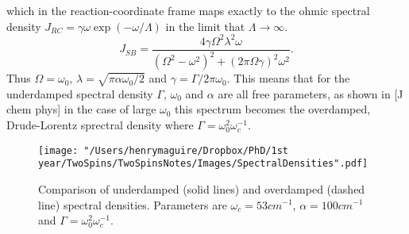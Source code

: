 \documentclass[]{article}
\begin{document}
which in the reaction-coordinate frame maps exactly to the ohmic spectral density $J_{RC} = \gamma \omega \exp(-\omega/\Lambda)$ in the limit that $\Lambda\to\infty$.
\begin{equation}
\label{eq:DrudeLorentzUnderdamped1}
J_{SB}  = \frac{4\gamma\Omega^2\lambda^2\omega}{(\Omega^2-\omega^2)^2 + (2\pi\Omega\gamma)^2\omega^2}.
\end{equation}
Thus $\Omega = \omega_0$, $\lambda=\sqrt{\pi \alpha \omega_0/2}$ and $\gamma=\Gamma/2\pi\omega_0$. This means that for the underdamped spectral density $\Gamma$, $\omega_0$ and $\alpha$ are all free parameters, as shown in [J chem phys] in the case of large $\omega_0$ this spectrum becomes the overdamped, Drude-Lorentz sprectral density where $\Gamma=\omega_0^2\omega_c^{-1}$.

\begin{figure}
	\texttt{[image: "/Users/henrymaguire/Dropbox/PhD/1st year/TwoSpins/TwoSpinsNotes/Images/SpectralDensities".pdf]}
	\caption{Comparison of underdamped (solid lines) and overdamped (dashed line) spectral densities. Parameters are $\omega_c=53cm^{-1}$, $\alpha=100cm^{-1}$ and $\Gamma=\omega_0^2\omega_c^{-1}$.}
\end{figure}
\end{document}
